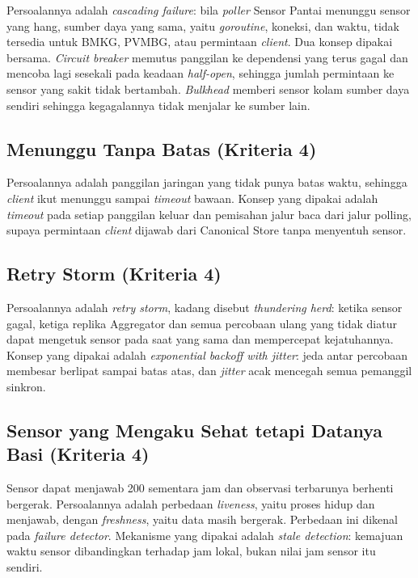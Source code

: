 Persoalannya adalah \textit{cascading failure}: bila \textit{poller} Sensor Pantai menunggu sensor yang hang, sumber daya yang sama, yaitu \textit{goroutine}, koneksi, dan waktu, tidak tersedia untuk BMKG, PVMBG, atau permintaan \textit{client}. Dua konsep dipakai bersama. \textit{Circuit breaker} memutus panggilan ke dependensi yang terus gagal dan mencoba lagi sesekali pada keadaan \textit{half-open}, sehingga jumlah permintaan ke sensor yang sakit tidak bertambah. \textit{Bulkhead} memberi sensor kolam sumber daya sendiri sehingga kegagalannya tidak menjalar ke sumber lain.

\subsection{Menunggu Tanpa Batas (Kriteria 4)}

Persoalannya adalah panggilan jaringan yang tidak punya batas waktu, sehingga \textit{client} ikut menunggu sampai \textit{timeout} bawaan. Konsep yang dipakai adalah \textit{timeout} pada setiap panggilan keluar dan pemisahan jalur baca dari jalur polling, supaya permintaan \textit{client} dijawab dari Canonical Store tanpa menyentuh sensor.

\subsection{Retry Storm (Kriteria 4)}

Persoalannya adalah \textit{retry storm}, kadang disebut \textit{thundering herd}: ketika sensor gagal, ketiga replika Aggregator dan semua percobaan ulang yang tidak diatur dapat mengetuk sensor pada saat yang sama dan mempercepat kejatuhannya. Konsep yang dipakai adalah \textit{exponential backoff with jitter}: jeda antar percobaan membesar berlipat sampai batas atas, dan \textit{jitter} acak mencegah semua pemanggil sinkron.

\subsection{Sensor yang Mengaku Sehat tetapi Datanya Basi (Kriteria 4)}

Sensor dapat menjawab 200 sementara jam dan observasi terbarunya berhenti bergerak. Persoalannya adalah perbedaan \textit{liveness}, yaitu proses hidup dan menjawab, dengan \textit{freshness}, yaitu data masih bergerak. Perbedaan ini dikenal pada \textit{failure detector}. Mekanisme yang dipakai adalah \textit{stale detection}: kemajuan waktu sensor dibandingkan terhadap jam lokal, bukan nilai jam sensor itu sendiri.

